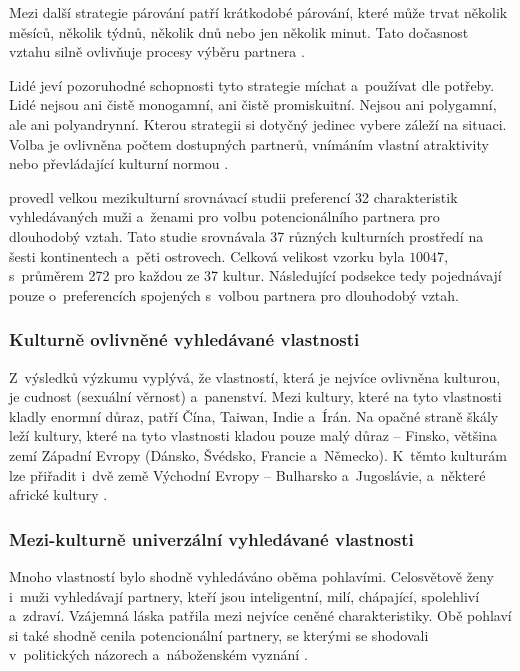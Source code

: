 \documentclass[a4paper, 12pt, notitlepage, oneside, numbers=noenddot]{report}
\begin{document}
Mezi další strategie párování patří krátkodobé párování, které může
trvat několik měsíců, několik týdnů, několik dnů nebo jen několik
minut.  Tato dočasnost vztahu silně ovlivňuje procesy výběru partnera
\citep{Buss2007}.

Lidé jeví pozoruhodné schopnosti tyto strategie míchat a~používat dle
potřeby.  Lidé nejsou ani čistě monogamní, ani čistě promiskuitní.
Nejsou ani polygamní, ale ani poly\-an\-dryn\-ní.  Kterou strategii si
dotyčný jedinec vybere záleží na situaci.  Volba je ovlivněna počtem
dostupných partnerů, vnímáním vlastní atraktivity nebo převládající
kulturní normou \citep{Buss2007,Murstein1970}.

\citet{BussEtAl1990,Buss2007} provedl velkou mezikulturní srovnávací
studii preferencí 32 charakteristik vyhledávaných muži a~ženami pro
volbu potencionálního partnera pro dlouhodobý vztah.  Tato studie
srovnávala 37 různých kulturních prostředí na šesti kontinentech
a~pěti ostrovech.  Celková velikost vzorku byla $10047$, s~průměrem
272 pro každou ze 37 kultur.  Následující podsekce tedy pojednávají
pouze o~preferencích spojených s~volbou partnera pro dlouhodobý vztah.

\subsubsection{Kulturně ovlivněné vyhledávané vlastnosti}

Z~výsledků výzkumu vyplývá, že vlastností, která je nejvíce ovlivněna
kulturou, je cudnost (sexuální věrnost) a~panenství.  Mezi kultury,
které na tyto vlastnosti kladly enormní důraz, patří Čína, Taiwan,
Indie a~Írán.  Na opačné straně škály leží kultury, které na tyto
vlastnosti kladou pouze malý důraz -- Finsko, většina zemí Západní
Evropy (Dánsko, Švédsko, Francie a~Německo).  K~těmto kulturám lze
přiřadit i~dvě země Východní Evropy -- Bulharsko a~Jugoslávie,
a~některé africké kultury \citep{BussEtAl1990,Buss2007}.

\subsubsection{Mezi-kulturně univerzální vyhledávané vlastnosti}

Mnoho vlastností bylo shodně vyhledáváno oběma pohlavími.  Celosvětově
ženy i~muži vyhledávají partnery, kteří jsou inteligentní, milí,
chápající, spolehliví a~zdraví.  Vzájemná láska patřila mezi nejvíce
ceněné charakteristiky.  Obě pohlaví si také shodně cenila
potencionální partnery, se kterými se shodovali v~politických názorech
a~náboženském vyznání \citep{Buss2007}.
\end{document}
